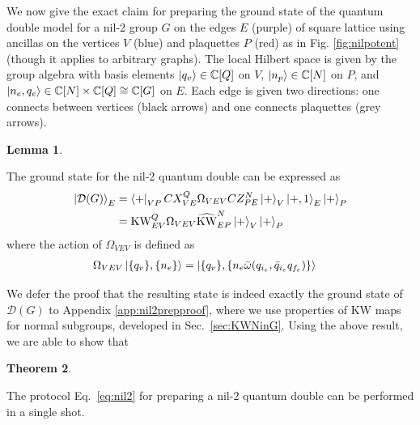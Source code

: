 \documentclass[nofootinbib,prx,twocolumn,showpacs,superscriptaddress,notitlepage,amsmath,amssymb]{revtex4-2}
\theoremstyle{definition}
\def\KW{\text{KW}}
\def\KWd{\widehat{\text{KW}}}
\def\bra#1{\mathinner{\langle{#1}|}}
\def\ket#1{\mathinner{|{#1}\rangle}}
\def\CC{\mathbb C}
\newtheorem{theorem}{Theorem}
\newtheorem{lemma}[theorem]{Lemma}
\begin{document}
We now give the exact claim for preparing the ground state of the quantum double model for a nil-2 group $G$ on the edges $E$ (purple) of square lattice using ancillas on the vertices $V$ (blue) and plaquettes $P$ (red) as in Fig. \ref{fig:nilpotent} (though it applies to arbitrary graphs).  The local Hilbert space is given by the group algebra with basis elements $\ket{q_v} \in \CC[Q]$ on $V$, $\ket{n_p} \in \CC[N]$ on $P$, and  $\ket{n_e,q_e} \in \CC[N]\times \CC[Q] \cong \CC[G]$ on $E$. Each edge is given two directions: one connects between vertices (black arrows) and one connects plaquettes (grey arrows).

\begin{lemma}
   \begin{shaded} 
   The ground state for the nil-2 quantum double can be expressed as
   \begin{align}
    \ket{\mathcal D(G)}_E &=\bra{+}_{VP} CX^Q_{VE}   \Omega_{VEV}    CZ^N_{PE} \ket{+}_{V}\ket{+,1}_E\ket{+}_P \nonumber\\
      &=\KW^Q_{EV} \Omega_{VEV} \KWd^N_{EP} \ket{+}_V \ket{+}_P \label{eq:nil2}
\end{align}
where the action of $\Omega_{VEV}$ is defined as\footnotemark
\begin{align}
      \Omega_{VEV} \ket{ \{q_v\},\{n_e\} } &= \ket{ \{q_v\},\{n_e \bar \omega(q_{i_e},\bar q_{i_e}q_{f_e})\} } \label{eq:OmegaVEV}
\end{align}
   \end{shaded}
\end{lemma}

We defer the proof that the resulting state is indeed exactly the ground state of $\mathcal D(G)$ to Appendix \ref{app:nil2prepproof}, where we use properties of KW maps for normal subgroups, developed in Sec.~\ref{sec:KWNinG}. Using the above result, we are able to show that

\begin{theorem}
\begin{shaded}
The protocol Eq.~\eqref{eq:nil2} for preparing a nil-2 quantum double can be performed in a single shot.
\end{shaded}
\end{theorem}
\end{document}
